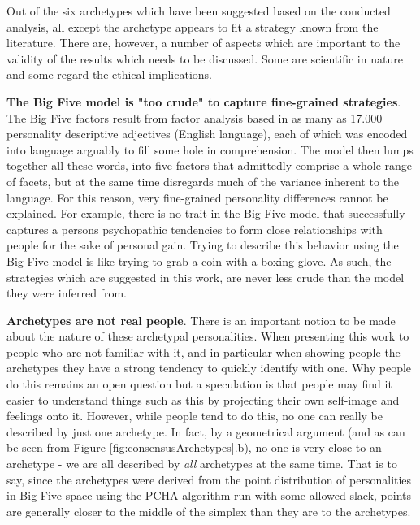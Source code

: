 Out of the six archetypes which have been suggested based on the conducted analysis, all except the \host archetype appears to fit a strategy known from the literature. There are, however, a number of aspects which are important to the validity of the results which needs to be discussed. Some are scientific in nature and some regard the ethical implications.

\textbf{The Big Five model is "too crude" to capture fine-grained strategies}.
The Big Five factors result from factor analysis based in as many as 17.000 personality descriptive adjectives (English language), each of which was encoded into language arguably to fill some hole in comprehension. The model then lumps together all these words, into five factors that admittedly comprise a whole range of facets, but at the same time disregards much of the variance inherent to the language. For this reason, very fine-grained personality differences cannot be explained. For example, there is no trait in the Big Five model that successfully captures a persons psychopathic tendencies to form close relationships with people for the sake of personal gain. Trying to describe this behavior using the Big Five model is like trying to grab a coin with a boxing glove. As such, the strategies which are suggested in this work, are never less crude than the model they were inferred from.


\textbf{Archetypes are not real people}.
There is an important notion to be made about the nature of these archetypal personalities. When presenting this work to people who are not familiar with it, and in particular when showing people the archetypes they have a strong tendency to quickly identify with one. Why people do this remains an open question but a speculation is that people may find it easier to understand things such as this by projecting their own self-image and feelings onto it. However, while people tend to do this, no one can really be described by just one archetype. In fact, by a geometrical argument (and as can be seen from Figure \ref{fig:consensusArchetypes}.b), no one is very close to an archetype - we are all described by \textit{all} archetypes at the same time. That is to say, since the archetypes were derived from the point distribution of personalities in Big Five space using the PCHA algorithm run with some allowed slack, points are generally closer to the middle of the simplex than they are to the archetypes.

